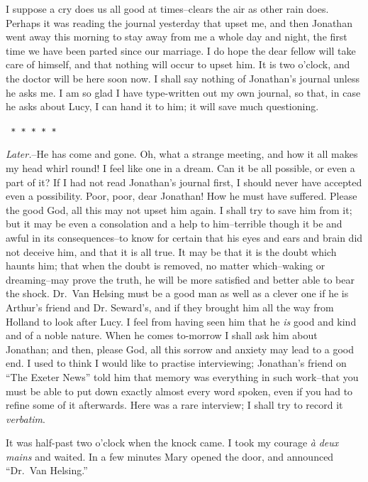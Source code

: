 \documentclass[12pt,openright]{book}
\begin{document}
I suppose a cry does us all good at times–clears the air as other rain does. Perhaps it was reading the journal yesterday that upset me, and then Jonathan went away this morning to stay away from me a whole day and night, the first time we have been parted since our marriage. I do hope the dear fellow will take care of himself, and that nothing will occur to upset him. It is two o’clock, and the doctor will be here soon now. I shall say nothing of Jonathan’s journal unless he asks me. I am so glad I have type-written out my own journal, so that, in case he asks about Lucy, I can hand it to him; it will save much questioning.

\texttt{   *       *       *       *       *}

\textit{Later.}–He has come and gone. Oh, what a strange meeting, and how it all makes my head whirl round! I feel like one in a dream. Can it be all possible, or even a part of it? If I had not read Jonathan’s journal first, I should never have accepted even a possibility. Poor, poor, dear Jonathan! How he must have suffered. Please the good God, all this may not upset him again. I shall try to save him from it; but it may be even a consolation and a help to him–terrible though it be and awful in its consequences–to know for certain that his eyes and ears and brain did not deceive him, and that it is all true. It may be that it is the doubt which haunts him; that when the doubt is removed, no matter which–waking or dreaming–may prove the truth, he will be more satisfied and better able to bear the shock. Dr. Van Helsing must be a good man as well as a clever one if he is Arthur’s friend and Dr. Seward’s, and if they brought him all the way from Holland to look after Lucy. I feel from having seen him that he \textit{is} good and kind and of a noble nature. When he comes to-morrow I shall ask him about Jonathan; and then, please God, all this sorrow and anxiety may lead to a good end. I used to think I would like to practise interviewing; Jonathan’s friend on “The Exeter News” told him that memory was everything in such work–that you must be able to put down exactly almost every word spoken, even if you had to refine some of it afterwards. Here was a rare interview; I shall try to record it \textit{verbatim}.

It was half-past two o’clock when the knock came. I took my courage \textit{à}\textit{ }\textit{deux mains} and waited. In a few minutes Mary opened the door, and announced “Dr. Van Helsing.”
\end{document}
